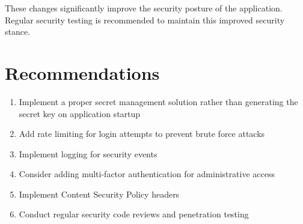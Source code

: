 \documentclass[11pt,a4paper]{article}
\begin{document}
These changes significantly improve the security posture of the application. Regular security testing is recommended to maintain this improved security stance.

\section{Recommendations}

\begin{enumerate}
    \item Implement a proper secret management solution rather than generating the secret key on application startup
    \item Add rate limiting for login attempts to prevent brute force attacks
    \item Implement logging for security events
    \item Consider adding multi-factor authentication for administrative access
    \item Implement Content Security Policy headers
    \item Conduct regular security code reviews and penetration testing
\end{enumerate}
\end{document}
